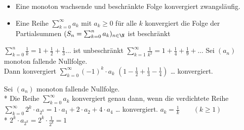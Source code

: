 %
\begin{itemize}
    \item{Eine monoton wachsende und beschränkte Folge konvergiert zwangsläufig.}
    \item{Eine Reihe $\sum_{k=0}^{∞} a_k$ mit $a_k \geq 0$ für alle $k$ konvergiert \equ die Folge der Partialsummen $(S_n = \sum_{k=0}^{n} a_k)_{n \in \N}$ ist beschränkt}
\end{itemize}
%
\bsp
    $\sum_{k=0}^{n} \frac{1}{k} = 1 + \frac{1}{2} + \frac{1}{3} …$ ist unbeschränkt
\bsp
    $\sum_{k=1}^{\infty} \frac{1}{k^2} = 1 + \frac{1}{4} + \frac{1}{9}+…$
    Sei $(a_n)$ monoton fallende Nullfolge.\\
    Dann konvergiert $\sum_{k=0}^{∞} (-1)^k \cdot a_k$
\bsp
    $(1 - \frac{1}{2} + \frac{1}{3} - \frac{1}{4})$ … konvergiert.

Sei $(a_n)$ monoton fallende Nullfolge.\\*
Die Reihe $\sum_{k=0}^{\infty} a_k$ konvergiert genau dann, wenn die verdichtete Reihe $\sum_{k=0}^{\infty} 2^k \cdot a_{2^k} = 1 · a_1 + 2 · a_2 + 4 \cdot a_4$ … konvergiert.
%
\bsp
    $a_k = \frac{1}{k}\qquad (k \geq 1)$\\*
    $2^k \cdot a_{2^k} = 2^k \cdot \frac{1}{2^k} = 1$

